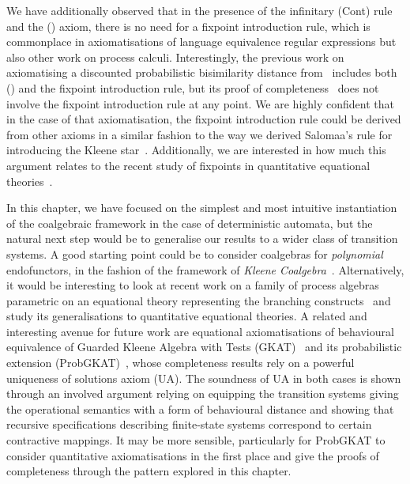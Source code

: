 We have additionally observed that in the presence of the infinitary \textsf{(Cont)} rule and the \textsf{(\dPref)} axiom, there is no need for a fixpoint introduction rule, which is commonplace in axiomatisations of language equivalence regular expressions but also other work on process calculi. Interestingly, the previous work on axiomatising a discounted probabilistic bisimilarity distance from~\cite{Bacci:2018:Bisimilarity} includes both \textsf{(\dPref)} and the fixpoint introduction rule, but its proof of completeness~\cite[Theorem~6.4]{Bacci:2018:Bisimilarity} does not involve the fixpoint introduction rule at any point. We are highly confident that in the case of that axiomatisation, the fixpoint introduction rule could be derived from other axioms in a similar fashion to the way we derived Salomaa's rule for introducing the Kleene star~\cite{Salomaa:1966:Two}. Additionally, we are interested in how much this argument relates to the recent study of fixpoints in quantitative equational theories~\cite{Mardare:2021:Fixed}. 

In this chapter, we have focused on the simplest and most intuitive instantiation of the coalgebraic framework in the case of deterministic automata, but the natural next step would be to generalise our results to a wider class of transition systems. A good starting point could be to consider coalgebras for \emph{polynomial} endofunctors, in the fashion of the framework of \emph{Kleene Coalgebra}~\cite{Silva:2010:Kleene}. Alternatively, it would be interesting to look at recent work on a family of process algebras parametric on an equational theory representing the branching constructs~\cite{Schmid:2022:Processes} and study its generalisations to quantitative equational theories. A related and interesting avenue for future work are equational axiomatisations of behavioural equivalence of Guarded Kleene Algebra with Tests (GKAT)~\cite{Smolka:2020:Guarded,Schmid:2022:Processes} and its probabilistic extension (ProbGKAT)~\cite{Rozowski:2023:Probabilistic}, whose completeness results rely on a powerful uniqueness of solutions axiom (UA). The soundness of UA in both cases is shown through an involved argument relying on equipping the transition systems giving the operational semantics with a form of behavioural distance and showing that recursive specifications describing finite-state systems correspond to certain contractive mappings. It may be more sensible, particularly for ProbGKAT to consider quantitative axiomatisations in the first place and give the proofs of completeness through the pattern explored in this chapter.
